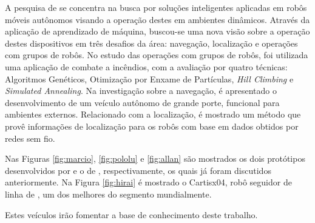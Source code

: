 A pesquisa de  se concentra na busca por soluções inteligentes aplicadas em robôs móveis autônomos visando a operação 
destes em ambientes dinâmicos. Através da aplicação de aprendizado de máquina, buscou-se uma nova visão sobre a operação destes 
dispositivos em três desafios da área: navegação, localização e operações com grupos de robôs. 
No estudo das operações com grupos de robôs, foi utilizada uma aplicação de combate a 
incêndios, com a avaliação por quatro técnicas: Algoritmos Genéticos, 
Otimização por Enxame de Partículas, \textit{Hill Climbing} e \textit{Simulated Annealing}. Na investigação sobre a navegação, é 
apresentado o desenvolvimento de um veículo autônomo de grande porte, funcional para ambientes externos. Relacionado com a localização, 
é mostrado um método que provê informações de localização para os robôs com base em dados obtidos por redes sem fio.



Nas Figuras \ref{fig:marcio}, \ref{fig:pololu} e \ref{fig:allan} são mostrados os dois protótipos desenvolvidos por  e 
o de , respectivamente, os quais já foram discutidos anteriormente. Na Figura \ref{fig:hirai} é mostrado o 
Cartisx04, robô seguidor de linha de , um dos melhores do segmento mundialmente.

Estes veículos irão fomentar a base de conhecimento deste trabalho.


